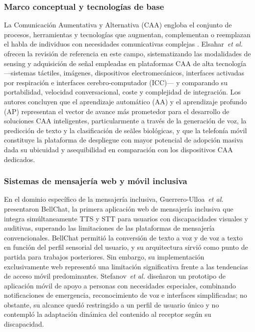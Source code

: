 \documentclass[journal]{IEEEtran}
\begin{document}
			\subsubsection{Marco conceptual y tecnolog\'ias de base}
				La Comunicaci\'on Aumentativa y Alternativa (CAA) engloba el conjunto de procesos, herramientas y tecnolog\'ias que augmentan, complementan o reemplazan el habla de individuos con necesidades comunicativas complejas \cite{elsahar2019}. Elsahar~\textit{et al.} \cite{elsahar2019} ofrecen la revisi\'on de referencia en este campo, sistematizando las modalidades de sensing y adquisici\'on de se\~nal empleadas en plataformas CAA de alta tecnolog\'ia ---sistemas t\'actiles, im\'agenes, dispositivos electromec\'anicos, interfaces activadas por respiraci\'on e interfaces cerebro-computador (ICC)--- y comparando su portabilidad, velocidad conversacional, coste y complejidad de integraci\'on. Los autores concluyen que el aprendizaje autom\'atico (AA) y el aprendizaje profundo (AP) representan el vector de avance m\'as prometedor para el desarrollo de soluciones CAA inteligentes, particularmente a trav\'es de la generaci\'on de voz, la predicci\'on de texto y la clasificaci\'on de se\~ales biol\'ogicas, y que la telefon\'ia m\'ovil constituye la plataforma de despliegue con mayor potencial de adopci\'on masiva dada su ubicuidad y asequibilidad en comparaci\'on con los dispositivos CAA dedicados.
			
			\subsubsection{Sistemas de mensajer\'ia web y m\'ovil inclusiva}
				En el dominio espec\'ifico de la mensajer\'ia inclusiva, Guerrero-Ulloa~\textit{et al.} \cite{guerrero2021bellchat} presentaron BellChat, la primera aplicaci\'on web de mensajer\'ia inclusiva que integra sim\'ultaneamente TTS y STT para usuarios con discapacidades visuales y auditivas, superando las limitaciones de las plataformas de mensajer\'ia convencionales. BellChat permiti\'o la conversi\'on de texto a voz y de voz a texto en funci\'on del perfil sensorial del usuario, y su arquitectura sirvi\'o como punto de partida para trabajos posteriores. Sin embargo, su implementaci\'on exclusivamente web represent\'o una limitaci\'on significativa frente a las tendencias de acceso m\'ovil predominantes. Stefanov~\textit{et al.} \cite{stefanov2024} dise\~naron un prototipo de aplicaci\'on m\'ovil de apoyo a personas con necesidades especiales, combinando notificaciones de emergencia, reconocimiento de voz e interfaces simplificadas; no obstante, su alcance qued\'o restringido a un perfil de usuario \'unico y no contempl\'o la adaptaci\'on din\'amica del contenido al receptor seg\'un su discapacidad.
				
\end{document}
